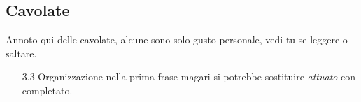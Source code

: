 \documentclass[11pt,a4paper]{article}
\begin{document}
  \subsection{Cavolate}
  \label{sub:Cavolate}

  Annoto qui delle cavolate, alcune sono solo gusto personale, vedi tu se leggere o saltare.

  \begin{itemize}
    \item [3.3 Organizzazione] nella prima frase magari si potrebbe sostituire \textit{attuato} con completato.
  \end{itemize}
\end{document}
